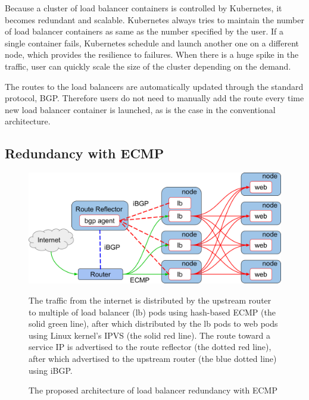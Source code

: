 Because a cluster of load balancer containers is controlled by Kubernetes, it becomes redundant and scalable.
Kubernetes always tries to maintain the number of load balancer containers as same as the number specified by the user.
If a single container fails, Kubernetes schedule and launch another one on a different node, which provides the resilience to failures.
When there is a huge spike in the traffic, user can quickly scale the size of the cluster depending on the demand.

The routes to the load balancers are automatically updated through the standard protocol, BGP.
Therefore users do not need to manually add the route every time new load balancer container is launched, as is the case in the conventional architecture.

\FloatBarrier

\subsection{Redundancy with ECMP}\label{Redundancy with ECMP}

\begin{figure}[tb]
  \centering
  \includegraphics[width=0.8\columnwidth]{Figs/ecmp.png}
\caption{The proposed architecture of load balancer redundancy with ECMP}

\vspace{1mm}

\begin{minipage}{0.9\columnwidth}
   The traffic from the internet is distributed by the upstream router to multiple of load balancer (lb) pods using hash-based ECMP (the solid green line), after which distributed by the lb pods to web pods using Linux kernel's IPVS (the solid red line).
  The route toward a service IP is advertised to the route reflector (the dotted red line), after which advertised to the upstream router (the blue dotted line) using iBGP.
\end{minipage}

\label{fig:ecmp}
\end{figure}

